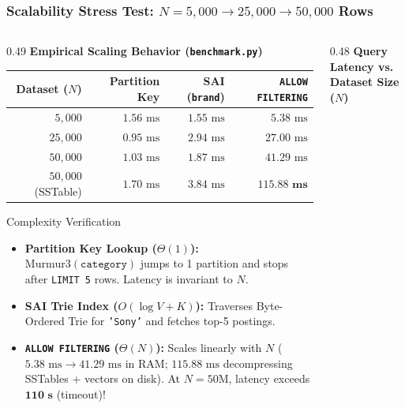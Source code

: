 \documentclass[aspectratio=169]{beamer}
\begin{document}
\begin{frame}
\frametitle{Scalability Stress Test: $N = 5,000 \rightarrow 25,000 \rightarrow 50,000$ Rows}
\begin{columns}[T]
\begin{column}{0.49\textwidth}
\textbf{\scriptsize Empirical Scaling Behavior (\texttt{benchmark.py})}
\vspace{0.05cm}
\centering
\tiny
\renewcommand{\arraystretch}{1.1}
\begin{tabular}{rrrr}
\toprule
\textbf{Dataset ($N$)} & \textbf{Partition Key} & \textbf{SAI (\texttt{brand})} & \textbf{\texttt{ALLOW FILTERING}} \\
\midrule
$5,000$  & $1.56\text{ ms}$ & $1.55\text{ ms}$ & $5.38\text{ ms}$ \\
$25,000$ & $0.95\text{ ms}$ & $2.94\text{ ms}$ & $27.00\text{ ms}$ \\
$50,000$ & $1.03\text{ ms}$ & $1.87\text{ ms}$ & $41.29\text{ ms}$ \\
$50,000$ (SSTable) & $1.70\text{ ms}$ & $3.84\text{ ms}$ & $\mathbf{115.88\text{ ms}}$ \\
\bottomrule
\end{tabular}

\vspace{0.08cm}
\raggedright
\begin{block}{\scriptsize Complexity Verification}
\tiny
\begin{itemize}
    \item \textbf{Partition Key Lookup ($\Theta(1)$):} $\text{Murmur3}(\texttt{category})$ jumps to 1 partition and stops after \texttt{LIMIT 5} rows. Latency is invariant to $N$.
    \item \textbf{SAI Trie Index ($O(\log V + K)$):} Traverses Byte-Ordered Trie for \texttt{'Sony'} and fetches top-5 postings.
    \item \textbf{\texttt{ALLOW FILTERING} ($\Theta(N)$):} Scales linearly with $N$ ($5.38\text{ ms} \rightarrow 41.29\text{ ms}$ in RAM; $115.88\text{ ms}$ decompressing SSTables + vectors on disk). At $N = 50\text{M}$, latency exceeds $\mathbf{110\text{ s}}$ (timeout)!
\end{itemize}
\end{block}
\end{column}
\begin{column}{0.48\textwidth}
\centering
\textbf{\scriptsize Query Latency vs. Dataset Size ($N$)}
\vspace{0.05cm}
\end{column}
\end{columns}
\end{frame}
\end{document}

